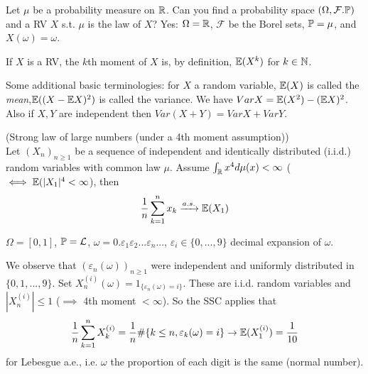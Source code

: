 \documentclass[a4paper]{article}
\begin{document}
Let $\mu$ be a probability measure on $\R$. Can you find a probability space $(\Omega,\mathcal{F}.\P)$ and a RV $X$ s.t. $\mu$ is the law of $X$? Yes: $\Omega = \R$, $\mathcal{F}$ be the Borel sets, $\P = \mu$, and $X(\omega) = \omega$.

\begin{defi}
If $X$ is a RV, the $k$th moment of $X$ is, by definition, $\E(X^k)$ for $k \in \N$.
\end{defi}

Some additional basic terminologies: for $X$ a random variable, $\E(X)$ is called the \emph{mean},$\E((X-\E X)^2)$ is called the variance. We have $Var X = \E(X^2)-(\E X)^2$. Also if $X,Y$ are independent then $Var(X+Y) = Var X + Var Y$.

\begin{thm} (Strong law of large numbers (under a 4th moment assumption))\\
Let $(X_n)_{n \geq 1}$ be a sequence of independent and identically distributed (i.i.d.) random variables with common law $\mu$. Assume $\int_\R x^4 d\mu(x) < \infty$ ($\iff \E(|X_1|^4 < \infty$), then
\begin{equation*}
\begin{aligned}
\frac{1}{n}\sum_{k=1}^n x_k \xrightarrow{a.s.} \E(X_1)
\end{aligned}
\end{equation*}
\end{thm}

\begin{eg}
$\Omega = [0,1]$, $\P = \mathcal{L}$, $\omega = 0.\varepsilon_1 \varepsilon_2...\varepsilon_n ...$, $\varepsilon_i \in \{0,...,9\}$ decimal expansion of $\omega$.

We observe that $(\varepsilon_n(\omega))_{n \geq 1}$ were independent and uniformly distributed in $\{0,1,...,9\}$. Set $X^{(i)}_n(\omega) = 1_{\{\varepsilon_n(\omega) = i\}}$. These are i.i.d. random variables and $|X^{(i)}_n| \leq 1$ ($\implies$ 4th moment $<\infty$). So the SSC applies that
\begin{equation*}
\begin{aligned}
\frac{1}{n} \sum_{k=1}^n X^{(i)}_k = \frac{1}{n} \# \{k \leq n, \varepsilon_k(\omega) = i\} \to \E(X^{(i)}_1) = \frac{1}{10}
\end{aligned}
\end{equation*}
for Lebesgue a.e., i.e. $\omega$ the proportion of each digit is the same (normal number).
\end{eg}
\end{document}
